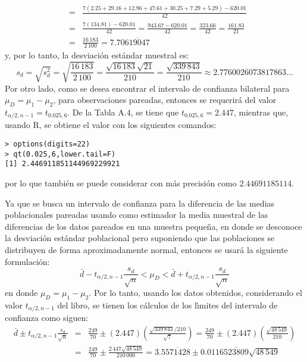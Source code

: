 \begin{solucion}
\begin{eqnarray*}
  & = & \frac{7(2.25 + 29.16 + 12.96 + 47.61 + 30.25 + 7.29 + 5.29) - 620.01}{42} \\
  & = & \frac{7(134.81) - 620.01}{42} = \frac{943.67 - 620.01}{42} = \frac{323.66}{42} = \frac{161.83}{21}\\
  & = & \frac{16\,183}{2\,100} = 7.70\overline{619047}
 \end{eqnarray*}
 y, por lo tanto, la desviaci\'on est\'andar muestral es:
 \begin{equation*}
  s_d = \sqrt{s_d^2} = \sqrt{\frac{16\,183}{2\,100}} = \frac{\sqrt{16\,183}\sqrt{21}}{210} = \frac{\sqrt{339\,843}}{210} \approx 2.7760026073817863\ldots
 \end{equation*}
 Por otro lado, como se desea encontrar el intervalo de  confianza bilateral para $\mu_D = \mu_1 - \mu_2$, para observaciones pareadas, entonces se requerir\'a del valor $t_{\alpha/2,n-1} = t_{0.025,6}$. De la Tabla A.4, se tiene que $t_{0.025,6} = 2.447$, mientras que, usando R, se obtiene el valor con los siguientes comandos:
 \begin{verbatim}
> options(digits=22)
> qt(0.025,6,lower.tail=F)
[1] 2.446911851144969229921
 \end{verbatim}
 \vspace{-0.5cm}
 por lo que tambi\'en se puede considerar con m\'as precisi\'on como $2.44691185114$.
 \par 
 Ya que se busca un intervalo de confianza para la diferencia de las medias poblacionales pareadas usando como estimador la media muestral de las diferencias de los datos pareados en una muestra peque\~na, en donde se desconoce la desviaci\'on est\'andar poblacional pero suponiendo que las poblaciones se distribuyen de forma aproximadamente normal, entonces se usar\'a la siguiente formulaci\'on:
 \begin{equation*}
  \bar{d} - t_{\alpha/2,n-1} \frac{s_d}{\sqrt{n}} < \mu_D < \bar{d} + t_{\alpha/2,n-1} \frac{s_d}{\sqrt{n}}
 \end{equation*}
 en donde $\mu_D = \mu_1 - \mu_2$. Por lo tanto, usando los datos obtenidos, considerando el valor $t_{\alpha/2,n-1}$ del libro, se tienen los c\'alculos de los l\'{\i}mites del intervalo de confianza como siguen:
 \begin{eqnarray*}
  \bar{d} \pm t_{\alpha/2,n-1} \frac{s_d}{\sqrt{n}} & = & \frac{249}{70} \pm (2.447)\left( \frac{\sqrt{339\,843}/210}{\sqrt{7}} \right) = \frac{249}{70} \pm (2.447)\left( \frac{\sqrt{48\,549}}{210} \right) \\
  & = & \frac{249}{70} \pm \frac{2\,447\sqrt{48\,549}}{210\,000} = 3.5\overline{571428} \pm 0.0116\overline{523809}\sqrt{48\,549} \\

\end{eqnarray*}
\end{solucion}
